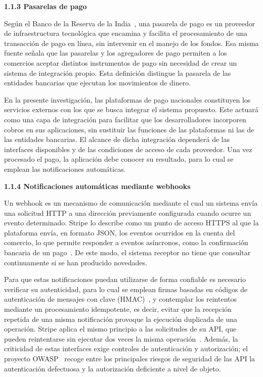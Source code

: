 \documentclass[12pt]{article}
\begin{document}
\textbf{1.1.3 Pasarelas de pago}

Según el Banco de la Reserva de la India~\cite{rbi19}, una pasarela de pago es un proveedor de infraestructura tecnológica que encamina y facilita el procesamiento de una transacción de pago en línea, sin intervenir en el manejo de los fondos. Esa misma fuente señala que las pasarelas y los agregadores de pago permiten a los comercios aceptar distintos instrumentos de pago sin necesidad de crear un sistema de integración propio. Esta definición distingue la pasarela de las entidades bancarias que ejecutan los movimientos de dinero.

En la presente investigación, las plataformas de pago nacionales constituyen los servicios externos con los que se busca integrar el sistema propuesto. Este actuará como una capa de integración para facilitar que los desarrolladores incorporen cobros en sus aplicaciones, sin sustituir las funciones de las plataformas ni las de las entidades bancarias. El alcance de dicha integración dependerá de las interfaces disponibles y de las condiciones de acceso de cada proveedor. Una vez procesado el pago, la aplicación debe conocer su resultado, para lo cual se emplean las notificaciones automáticas.

\textbf{1.1.4 Notificaciones automáticas mediante webhooks}

Un webhook es un mecanismo de comunicación mediante el cual un sistema envía una solicitud HTTP a una dirección previamente configurada cuando ocurre un evento determinado. Stripe lo describe como un punto de acceso HTTPS al que la plataforma envía, en formato JSON, los eventos ocurridos en la cuenta del comercio, lo que permite responder a eventos asíncronos, como la confirmación bancaria de un pago~\cite{stripeweb}. De este modo, el sistema receptor no tiene que consultar continuamente si se han producido novedades.

Para que estas notificaciones puedan utilizarse de forma confiable es necesario verificar su autenticidad, para lo cual se emplean firmas basadas en códigos de autenticación de mensajes con clave (HMAC)~\cite{rfc2104}, y contemplar los reintentos mediante un procesamiento idempotente, es decir, evitar que la recepción repetida de una misma notificación provoque la ejecución duplicada de una operación. Stripe aplica el mismo principio a las solicitudes de su API, que pueden reintentarse sin ejecutar dos veces la misma operación~\cite{stripeidem}. Además, la criticidad de estas interfaces exige controles de autenticación y autorización; el proyecto OWASP~\cite{owasp23} recoge entre los principales riesgos de seguridad de las API la autenticación defectuosa y la autorización deficiente a nivel de objeto.
\end{document}
